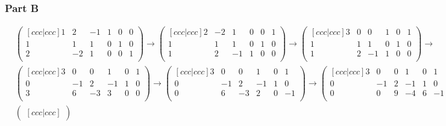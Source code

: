 \documentclass[12pt,titlepage]{extarticle}
\begin{document}
\subsubsection*{Part B}
\begin{align*}
    &\begin{pmatrix}[ccc|ccc]
        1 & 2  & -1 & 1 & 0 & 0 \\
        1 & 1  & 1  & 0 & 1 & 0 \\
        2 & -2 & 1  & 0 & 0 & 1 \\
    \end{pmatrix} \rightarrow
    \begin{pmatrix}[ccc|ccc]
        2 & -2 & 1  & 0 & 0 & 1 \\
        1 & 1  & 1  & 0 & 1 & 0 \\
        1 & 2  & -1 & 1 & 0 & 0 \\
    \end{pmatrix} \rightarrow
    \begin{pmatrix}[ccc|ccc]
        3 & 0  & 0  & 1 & 0 & 1 \\
        1 & 1  & 1  & 0 & 1 & 0 \\
        1 & 2  & -1 & 1 & 0 & 0 \\
    \end{pmatrix} \rightarrow \\
    &
    \begin{pmatrix}[ccc|ccc]
        3 & 0  & 0  & 1  & 0 & 1 \\
        0 & -1 & 2  & -1 & 1 & 0 \\
        3 & 6  & -3 & 3  & 0 & 0 \\
    \end{pmatrix} \rightarrow
    \begin{pmatrix}[ccc|ccc]
        3 & 0  & 0  & 1  & 0 & 1 \\
        0 & -1 & 2  & -1 & 1 & 0 \\
        0 & 6  & -3 & 2  & 0 & -1 \\
    \end{pmatrix} \rightarrow
    \begin{pmatrix}[ccc|ccc]
        3 & 0  & 0  & 1  & 0 & 1 \\
        0 & -1 & 2  & -1 & 1 & 0 \\
        0 & 0  & 9 & -4  & 6 & -1 \\
    \end{pmatrix} \rightarrow \\
    &
    \begin{pmatrix}[ccc|ccc]

\end{pmatrix}
\end{align*}
\end{document}
